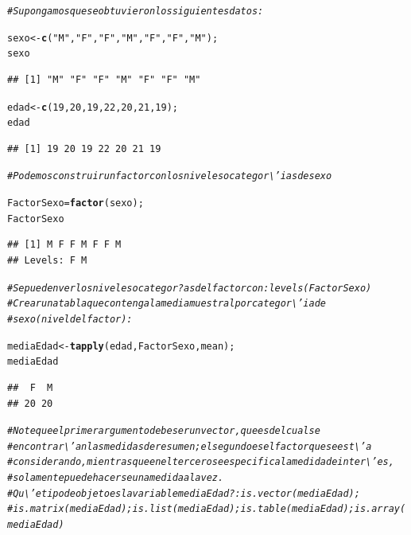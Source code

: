 \documentclass[12pt,letterpaper]{article}\usepackage[]{graphicx}\usepackage[]{color}
\makeatletter
\newcommand{\hlnum}[1]{\textcolor[rgb]{0.686,0.059,0.569}{#1}}%
\newcommand{\hlstr}[1]{\textcolor[rgb]{0.192,0.494,0.8}{#1}}%
\newcommand{\hlcom}[1]{\textcolor[rgb]{0.678,0.584,0.686}{\textit{#1}}}%
\newcommand{\hlstd}[1]{\textcolor[rgb]{0.345,0.345,0.345}{#1}}%
\newcommand{\hlkwb}[1]{\textcolor[rgb]{0.69,0.353,0.396}{#1}}%
\newcommand{\hlkwd}[1]{\textcolor[rgb]{0.737,0.353,0.396}{\textbf{#1}}}%
\newenvironment{kframe}{%
 \def\at@end@of@kframe{}%
 \ifinner\ifhmode%
  \def\at@end@of@kframe{\end{minipage}}%
  \begin{minipage}{\columnwidth}%
 \fi\fi%
 \def\FrameCommand##1{\hskip\@totalleftmargin \hskip-\fboxsep
 \colorbox{shadecolor}{##1}\hskip-\fboxsep
     \hskip-\linewidth \hskip-\@totalleftmargin \hskip\columnwidth}%
 \MakeFramed {\advance\hsize-\width
   \@totalleftmargin\z@ \linewidth\hsize
   \@setminipage}}%
 {\par\unskip\endMakeFramed%
 \at@end@of@kframe}
\newenvironment{knitrout}{}{} %
\makeatother
\begin{document}
\begin{knitrout}
\color{fgcolor}\begin{kframe}
\begin{alltt}
\hlcom{# Supongamos que se obtuvieron los siguientes datos:}

\hlstd{sexo} \hlkwb{<-} \hlkwd{c}\hlstd{(}\hlstr{"M"}\hlstd{,} \hlstr{"F"}\hlstd{,} \hlstr{"F"}\hlstd{,} \hlstr{"M"}\hlstd{,} \hlstr{"F"}\hlstd{,} \hlstr{"F"}\hlstd{,} \hlstr{"M"}\hlstd{);}
\hlstd{sexo}
\end{alltt}
\begin{verbatim}
## [1] "M" "F" "F" "M" "F" "F" "M"
\end{verbatim}
\begin{alltt}
\hlstd{edad} \hlkwb{<-} \hlkwd{c}\hlstd{(}\hlnum{19}\hlstd{,} \hlnum{20}\hlstd{,} \hlnum{19}\hlstd{,} \hlnum{22}\hlstd{,} \hlnum{20}\hlstd{,} \hlnum{21}\hlstd{,} \hlnum{19}\hlstd{);}
\hlstd{edad}
\end{alltt}
\begin{verbatim}
## [1] 19 20 19 22 20 21 19
\end{verbatim}
\begin{alltt}
\hlcom{# Podemos construir un factor con los niveles o categor\textbackslash{}'ias de sexo}

\hlstd{FactorSexo} \hlkwb{=} \hlkwd{factor}\hlstd{(sexo);}
\hlstd{FactorSexo}
\end{alltt}
\begin{verbatim}
## [1] M F F M F F M
## Levels: F M
\end{verbatim}
\begin{alltt}
\hlcom{# Se pueden ver los niveles o categor?as del factor con: levels(FactorSexo)}
\hlcom{# Crear una tabla que contenga la media muestral por categor\textbackslash{}'ia de }
\hlcom{# sexo (nivel del factor):}

\hlstd{mediaEdad} \hlkwb{<-} \hlkwd{tapply}\hlstd{(edad, FactorSexo, mean);}
\hlstd{mediaEdad}
\end{alltt}
\begin{verbatim}
##  F  M 
## 20 20
\end{verbatim}
\begin{alltt}
\hlcom{# Note que el primer argumento debe ser un vector, que es del cual se }
\hlcom{# encontrar\textbackslash{}'an las medidas de resumen; el segundo es el factor que se est\textbackslash{}'a }
\hlcom{# considerando, mientras que en el tercero se especifica la medida de inter\textbackslash{}'es, }
\hlcom{# solamente puede hacerse una medida a la vez.}
\hlcom{# Qu\textbackslash{}'e tipo de objeto es la variable mediaEdad?: is.vector(mediaEdad); }
\hlcom{# is.matrix(mediaEdad); is.list(mediaEdad); is.table(mediaEdad); is.array(mediaEdad)}


\end{alltt}
\end{kframe}
\end{knitrout}
\end{document}
